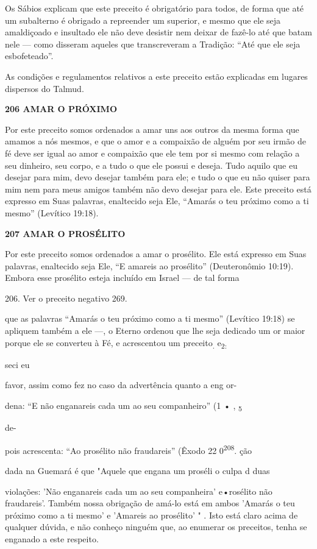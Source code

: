Os Sábios explicam que este preceito é obrigatório para todos, de forma
que até um subalterno é obrigado a repreender um superior, e mesmo que
ele seja amaldiçoado e insultado ele não deve desistir nem deixar de
fazê-lo até que batam nele --- como disseram aqueles que transcreveram a
Tradição: ``Até que ele seja esbofeteado''.

As condições e regulamentos relativos a este preceito estão explica­das
em lugares dispersos do Talmud.

\textbf{206 AMAR O PRÓXIMO}

Por este preceito somos ordenados a amar uns aos outros da mesma forma
que amamos a nós mesmos, e que o amor e a compaixão de alguém por seu
irmão de fé deve ser igual ao amor e compaixão que ele tem por si mesmo
com relação a seu dinheiro, seu corpo, e a tudo o que ele possui e
deseja. Tudo aquilo que eu desejar para mim, devo desejar também para
ele; e tudo o que eu não quiser para mim nem para meus amigos também não
devo desejar para ele. Este preceito está expresso em Suas palavras,
enaltecido seja Ele, ``Amarás o teu próximo como a ti mesmo'' (Levítico
19:18).

\textbf{207 AMAR O PROSÉLITO}

Por este preceito somos ordenados a amar o prosélito. Ele está ex­presso
em Suas palavras, enaltecido seja Ele, ``E amareis ao prosélito''
(Deute­ronômio 10:19). Embora esse prosélito esteja incluído em Israel
--- de tal forma

206. Ver o preceito negativo 269.

que as palavras ``Amarás o teu próximo como a ti mesmo'' (Levítico 19:18)
se apliquem também a ele ---, o Eterno ordenou que lhe seja dedicado um
or maior porque ele se converteu à Fé, e acrescentou um
preceito\textsubscript{.} e\textsubscript{2:}

seci eu

favor, assim como fez no caso da advertência quanto a eng or-

dena: ``E não enganareis cada um ao seu companheiro'' (1 • ,
\textsubscript{5}


de-


pois acrescenta: ``Ao prosélito não fraudareis'' (Êxodo 22
0\textsuperscript{208}. ção

dada na Guemará é que "Aquele que engana um proséli o culpa d duas

violações: 'Não enganareis cada um ao seu companheira' e•rosélito não
fraudareis'. Também nossa obrigação de amá-lo está em ambos 'Amarás o
teu próximo como a ti mesmo' e 'Amareis ao prosélito' " . Isto está
claro acima de qualquer dúvida, e não conheço ninguém que, ao enumerar
os preceitos, te­nha se enganado a este respeito.

